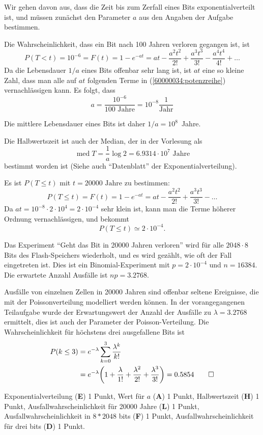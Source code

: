 \begin{loesung}
Wir gehen davon aus, dass die Zeit bis zum Zerfall eines Bits 
exponentialverteilt ist, und müssen zunächst den Parameter $a$
aus den Angaben der Aufgabe bestimmen.

Die Wahrscheinlichkeit, dass ein Bit nach 100 Jahren verloren gegangen
ist, ist
\begin{equation}
P(T < t) = 10^{-6}=
F(t)=1-e^{-at}
=at-\frac{a^2t^2}{2!}+\frac{a^3t^3}{3!}-\frac{a^4t^4}{4!}+\dots
\label{60000034:potenzreihe}
\end{equation}
Da die Lebensdauer $1/a$ eines Bits offenbar sehr lang ist, ist $at$
eine so kleine Zahl, dass man alle auf $at$ folgenden Terme
in (\ref{60000034:potenzreihe}) vernachlässigen kann. Es folgt, dass
\[
a=\frac{10^{-6}}{100\text{ Jahre}}=10^{-8}\frac{1}{\text{Jahr}}
\]
\begin{teilaufgaben}
\item
Die mittlere Lebensdauer eines Bits ist daher $1/a=10^8$~Jahre.
\item
Die Halbwertszeit ist auch der Median, der in der Vorlesung als
\[
\operatorname{med} T=\frac1a\log 2=6.9314\cdot10^{7} \text{ Jahre}
\]
bestimmt worden ist (Siehe auch ``Datenblatt'' der Exponentialverteilung).
\item
Es ist $P(T\le t)$ mit $t=20000\text{ Jahre}$ zu bestimmen:
\[
P(T\le t)
=
F(t)
=
1-e^{-at}
=
at-\frac{a^2t^2}{2!}+\frac{a^3t^3}{3!}-\dots
\]
Da $at=10^{-8}\cdot 2\cdot 10^4=2\cdot 10^{-4}$ sehr klein ist, kann man die 
Terme höherer Ordnung vernachlässigen, und bekommt
\[
P(T\le t) \simeq 2\cdot 10^{-4}.
\]
\item 
Das Experiment ``Geht das Bit in 20000 Jahren verloren'' wird
für alle $2048\cdot 8$ Bits des Flash-Speichers wiederholt, und es
wird gezählt, wie oft der Fall eingetreten ist.
Dies ist ein Binomial-Experiment mit $p=2\cdot 10^{-4}$ und $n=16384$.
Die erwartete Anzahl Ausfälle ist $np=3.2768$.
\item
Ausfälle von einzelnen Zellen in 20000 Jahren sind offenbar seltene Ereignisse,
die mit der Poissonverteilung modelliert werden können.
In der vorangegangenen Teilaufgabe wurde der Erwartungswert der Anzahl
der Ausfälle zu $\lambda = 3.2768$ ermittelt, dies ist auch der Parameter
der Poisson-Verteilung.
Die Wahrscheinlichkeit für höchstens drei ausgefallene Bits ist
\begin{align*}
P(k\le 3)&=e^{-\lambda}\sum_{k=0}^3\frac{\lambda^k}{k!}
\\
&=e^{-\lambda}\biggl(
1+\frac{\lambda}{1!}
+
\frac{\lambda^2}{2!}
+
\frac{\lambda^3}{3!}
\biggr)
=0.5854
\qedhere
\end{align*}
\end{teilaufgaben}
\end{loesung}

\begin{bewertung}
Exponentialverteilung ({\bf E}) 1 Punkt,
Wert für $a$ ({\bf A}) 1 Punkt,
Halbwertszeit ({\bf H}) 1 Punkt,
Ausfallwahrscheinlichkeit für 20000 Jahre ({\bf L}) 1 Punkt,
Ausfallwahrscheinlichkeit in $8*2048$ bits ({\bf F}) 1 Punkt,
Ausfallwahrscheinlichkeit für drei bits ({\bf D}) 1 Punkt.
\end{bewertung}

